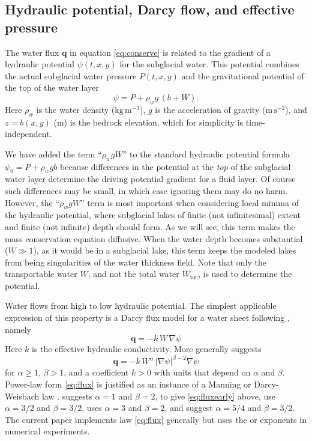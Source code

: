 \documentclass[11pt,final]{amsart}
\newcommand\bq{\mathbf{q}}
\newcommand{\grad}{\nabla}
\newcommand{\Wtot}{W_{\text{tot}}}
\begin{document}
\subsection*{Hydraulic potential, Darcy flow, and effective pressure}  The water flux $\bq$ in equation \eqref{eq:conserve} is related to the gradient of a hydraulic potential $\psi(t,x,y)$ for the subglacial water.  This potential combines the actual subglacial water pressure $P(t,x,y)$ and the gravitational potential of the top of the water layer \citep{Goelleretal2013,Hewittetal2012}
\begin{equation} \label{eq:potential}
\psi = P + \rho_w g\, (b+W).
\end{equation}
Here $\rho_w$ is the water density ($\text{kg}\,\text{m}^{-3}$), $g$ is the acceleration of gravity ($\text{m}\,\text{s}^{-2}$), and $z=b(x,y)$ ($\text{m}$) is the bedrock elevation, which for simplicity is time-independent.

We have added the term ``$\rho_w g W$'' to the standard hydraulic potential formula $\psi_0 = P + \rho_w g b$ \citep[for example]{Clarke05} because differences in the potential at the \emph{top} of the subglacial water layer determine the driving potential gradient for a fluid layer.  Of course such differences may be small, in which case ignoring them may do no harm.  However, the  ``$\rho_w g W$'' term is most important when considering local minima of the hydraulic potential, where subglacial lakes of finite (not infinitesimal) extent and finite (not infinite) depth should form.  As we will see, this term makes the mass conservation equation diffusive.  When the water depth becomes substantial ($W\gg 1$), as it would be in a subglacial lake, this term keeps the modeled lakes from being singularities of the water thickness field.  Note that only the transportable water $W$, and not the total water $\Wtot$, is used to determine the potential.

Water flows from high to low hydraulic potential.  The simplest applicable expression of this property is a Darcy flux model for a water sheet following \cite{Clarke05}, namely
\begin{equation}  \label{eq:fluxearly}
\bq = - k \,W\, \grad \psi
\end{equation}
Here $k$ is the effective hydraulic conductivity.  More generally \cite{Schoofetal2012} suggests
\begin{equation}  \label{eq:flux}
\bq = - k\, W^\alpha\, |\grad \psi|^{\beta-2} \grad \psi
\end{equation}
for $\alpha \ge 1$, $\beta>1$, and a coefficient $k>0$ with units that depend on $\alpha$ and $\beta$.  Power-law form \eqref{eq:flux} is justified as an instance of a Manning or Darcy-Weisbach law \citep{Schoofetal2012}.  \cite{Clarke05} suggests $\alpha=1$ and $\beta=2$, to give \eqref{eq:fluxearly} above, \cite{CreytsSchoof2009} use $\alpha=3/2$ and $\beta=3/2$, \cite{Hewitt2011} uses $\alpha=3$ and $\beta = 2$, and \cite{Hewittetal2012} suggest $\alpha=5/4$ and $\beta=3/2$.  The current paper implements law \eqref{eq:flux} generally but uses the \cite{Clarke05} or \cite{Hewittetal2012} exponents in numerical experiments.
\end{document}
